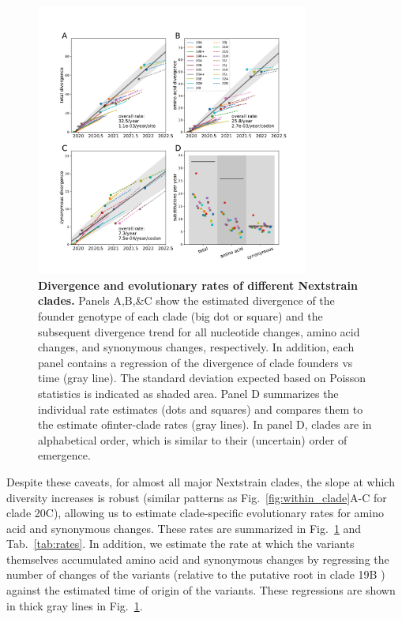 \documentclass[aps,rmp, twocolumn]{revtex4}
\begin{document}
\begin{figure}
    \includegraphics[width=0.8\textwidth]{figures/rate_summary.pdf}
    \caption[]{{\bf Divergence and evolutionary rates of different Nextstrain clades.} Panels A,B,\&C show the estimated divergence of the founder genotype of each clade (big dot or square) and the subsequent divergence trend for all nucleotide changes, amino acid changes, and synonymous changes, respectively.
    In addition, each panel contains a regression of the divergence of clade founders vs time (gray line).
    The standard deviation expected based on Poisson statistics is indicated as shaded area.
    Panel D summarizes the individual rate estimates (dots and squares) and compares them to the estimate ofinter-clade rates (gray lines).
    In panel D, clades are in alphabetical order, which is similar to their (uncertain) order of emergence.
    \label{fig:rate_summary} }
\end{figure}

Despite these caveats, for almost all major Nextstrain clades, the slope at which diversity increases is robust (similar patterns as Fig.~\ref{fig:within_clade}A-C for clade 20C), allowing us to estimate clade-specific evolutionary rates for amino acid and synonymous changes.
These rates are summarized in Fig.~\ref{fig:rate_summary} and Tab.~\ref{tab:rates}.
In addition, we estimate the rate at which the variants themselves accumulated amino acid and synonymous changes by regressing the number of changes of the variants (relative to the putative root in clade 19B \citep{caraballo-ortiz_tophap_2022}) against the estimated time of origin of the variants.
These regressions are shown in thick gray lines in Fig.~\ref{fig:rate_summary}.
\end{document}
